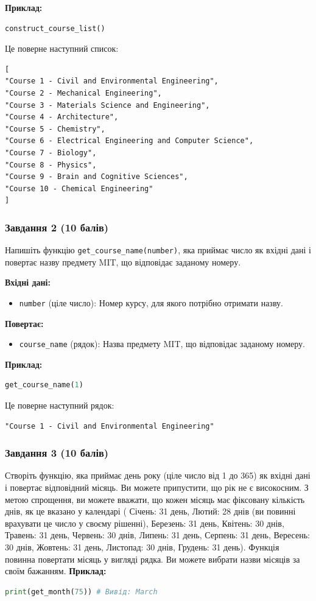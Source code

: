 \documentclass[12pt]{article}
\begin{document}
\textbf{Приклад:}
\begin{lstlisting}[language=Python]
construct_course_list()
\end{lstlisting}
Це поверне наступний список:
\begin{verbatim}
[
"Course 1 - Civil and Environmental Engineering",
"Course 2 - Mechanical Engineering",
"Course 3 - Materials Science and Engineering",
"Course 4 - Architecture",
"Course 5 - Chemistry",
"Course 6 - Electrical Engineering and Computer Science",
"Course 7 - Biology",
"Course 8 - Physics",
"Course 9 - Brain and Cognitive Sciences",
"Course 10 - Chemical Engineering"
]
\end{verbatim}

\subsubsection{Завдання 2 (10 балів)}
Напишіть функцію \texttt{get\_course\_name(number)}, яка приймає число як вхідні дані і повертає назву предмету MIT, що відповідає заданому номеру.

\textbf{Вхідні дані:}
\begin{itemize}
\item \texttt{number} (ціле число): Номер курсу, для якого потрібно отримати назву.
\end{itemize}

\textbf{Повертає:}
\begin{itemize}
\item \texttt{course\_name} (рядок): Назва предмету MIT, що відповідає заданому номеру.
\end{itemize}

\textbf{Приклад:}
\begin{lstlisting}[language=Python]
get_course_name(1)
\end{lstlisting}
Це поверне наступний рядок:
\begin{verbatim}
"Course 1 - Civil and Environmental Engineering"
\end{verbatim}

\subsubsection{Завдання 3 (10 балів)}
Створіть функцію, яка приймає день року (ціле число від 1 до 365) як вхідні дані і повертає відповідний місяць. Ви можете припустити, що рік не є високосним. З метою спрощення, ви можете вважати, що кожен місяць має фіксовану кількість днів, як це вказано у календарі (
Січень: 31 день,
Лютий: 28 днів (ви повинні врахувати це число у своєму рішенні),
Березень: 31 день,
Квітень: 30 днів,
Травень: 31 день,
Червень: 30 днів,
Липень: 31 день,
Серпень: 31 день,
Вересень: 30 днів,
Жовтень: 31 день,
Листопад: 30 днів,
Грудень: 31 день). Функція повинна повертати місяць у вигляді рядка. Ви можете вибрати назви місяців за своїм бажанням.
\textbf{Приклад:}
\begin{lstlisting}[language=Python]
print(get_month(75)) # Вивід: March
\end{lstlisting}
\end{document}
